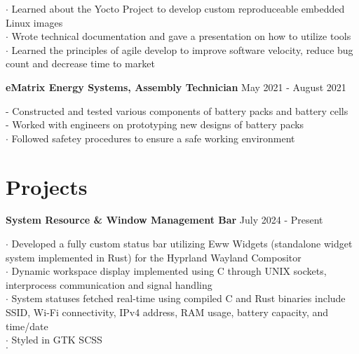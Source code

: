 \documentclass[letter,12pt]{article}
\begin{document}
$\cdot$ Learned about the Yocto Project to develop custom reproduceable 
embedded Linux images\\
$\cdot$ Wrote technical documentation and gave a presentation on 
how to utilize tools\\
$\cdot$ Learned the principles of agile develop to improve software 
velocity, reduce bug count and decrease time to market\\
\begin{tcolorbox}
[colback=gray!25,
  leftrule=0pt,
  rightrule=0pt,
  sharp corners]
 \textbf{eMatrix Energy Systems, Assembly Technician}
\hfill May 2021 - August 2021 
\end{tcolorbox}
\noindent 
- Constructed and tested various components of
battery packs and battery cells\\ 
- Worked with engineers on prototyping new designs of battery packs\\
$\cdot$ Followed safetey procedures to ensure a safe working environment
\vspace{-.5cm} 

\section*{Projects} 
\vspace{-.25cm}
\begin{tcolorbox}
[colback=gray!25,
  leftrule=0pt,
  rightrule=0pt,
  sharp corners]
  \textbf{System Resource \& Window Management Bar}
\hfill July 2024 - Present
\end{tcolorbox}
\noindent
$\cdot$ Developed a fully custom status bar utilizing Eww Widgets 
(standalone widget system implemented in Rust) for the Hyprland Wayland 
Compositor\\
$\cdot$ Dynamic workspace display implemented using C through UNIX sockets, interprocess 
communication and signal handling\\
$\cdot$ System statuses fetched real-time using compiled C and Rust binaries include
SSID, Wi-Fi connectivity, IPv4 address, RAM usage, battery capacity, and time/date\\
$\cdot$ Styled in GTK SCSS \\
$\cdot$ \href{https://github.com/DMGDy/eww-bar}
{}
\end{document}
